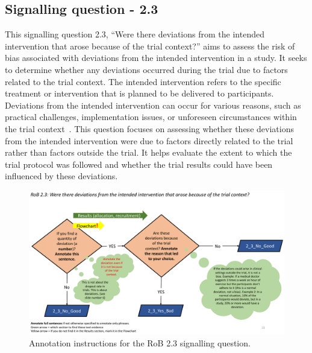 \documentclass[sn-mathphys,Numbered]{sn-jnl}%
\begin{document}
\subsection*{Signalling question - 2.3}
\label{subsec:2_3}
%
This signalling question 2.3, ``Were there deviations from the intended intervention that arose because of the trial context?'' aims to assess the risk of bias associated with deviations from the intended intervention in a study.
It seeks to determine whether any deviations occurred during the trial due to factors related to the trial context.
The intended intervention refers to the specific treatment or intervention that is planned to be delivered to participants.
Deviations from the intended intervention can occur for various reasons, such as practical challenges, implementation issues, or unforeseen circumstances within the trial context~\cite{paterson2019feasibility}.
This question focuses on assessing whether these deviations from the intended intervention were due to factors directly related to the trial rather than factors outside the trial.
It helps evaluate the extent to which the trial protocol was followed and whether the trial results could have been influenced by these deviations.

%
%
%
\begin{figure}[hbt]
    \centering
    \includegraphics[width=\textwidth]{figures/2_3.pdf}
    \caption{Annotation instructions for the RoB 2.3 signalling question.}
    \label{fig:2_3}
\end{figure}
%
%
%
\end{document}
